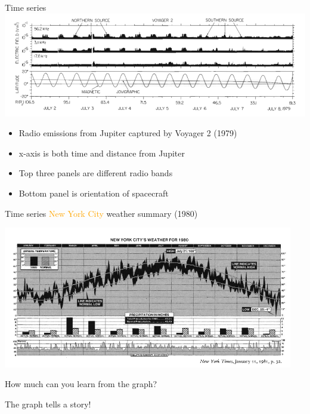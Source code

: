 \documentclass[
  ignorenonframetext,
]{beamer}
\begin{document}
\begin{frame}{Time series}
\protect\hypertarget{time-series-1}{}
\includegraphics{excellence_figs/fig_14.png}

\begin{itemize}
\item
  Radio emissions from Jupiter captured by Voyager 2 (1979)
\item
  x-axis is both time and distance from Jupiter
\item
  Top three panels are different radio bands
\item
  Bottom panel is orientation of spacecraft
\end{itemize}
\end{frame}

\begin{frame}{Time series}
\protect\hypertarget{time-series-2}{}
\textcolor{orange}{New York City} weather summary (1980)

\includegraphics[width=0.95\textwidth,height=\textheight]{excellence_figs/fig_15.png}

How much can you learn from the graph?

The graph tells a story!
\end{frame}
\end{document}
